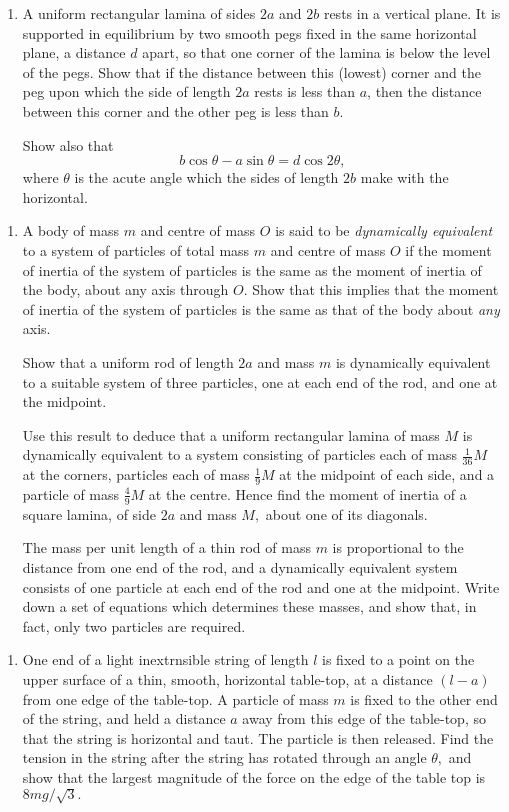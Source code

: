 \documentclass[a4, 11pt]{report}
\newlength{\qspace}
\newcounter{qnumber}
\newenvironment{question}%
 {\vspace{\qspace}
  \begin{enumerate}[\bfseries 1\quad][10]%
    \setcounter{enumi}{\value{qnumber}}%
    \item%
 }
{
  \end{enumerate}
  \filbreak
  \stepcounter{qnumber}
 }
\begin{document}
\begin{question}	
A uniform rectangular lamina of sides $2a$ and $2b$ rests in a vertical
plane. It is supported in equilibrium by two smooth pegs fixed in
the same horizontal plane, a distance $d$ apart, so that one corner
of the lamina is below the level of the pegs. Show that if the distance
between this (lowest) corner and the peg upon which the side of length
$2a$ rests is less than $a$, then the distance between this corner
and the other peg is less than $b$. 


Show also that 
\[
b\cos\theta-a\sin\theta=d\cos2\theta,
\]
where $\theta$ is the acute angle which the sides of length $2b$
make with the horizontal.
\end{question}


\begin{question}
A body of mass $m$ and centre of mass $O$ is said to be \textit{dynamically
equivalent }to a system of particles of total mass $m$ and centre
of mass $O$ if the moment of inertia of the system of particles is
the same as the moment of inertia of the body, about any axis through
$O$. Show that this implies that the moment of inertia of the system
of particles is the same as that of the body about \textit{any }axis. 


Show that a uniform rod of length $2a$ and mass $m$ is dynamically
equivalent to a suitable system of three particles, one at each end
of the rod, and one at the midpoint. 


Use this result to deduce that a uniform rectangular lamina of mass
$M$ is dynamically equivalent to a system consisting of particles
each of mass $\frac{1}{36}M$ at the corners, particles each of mass
$\frac{1}{9}M$ at the midpoint of each side, and a particle of mass
$\frac{4}{9}M$ at the centre. Hence find the moment of inertia of
a square lamina, of side $2a$ and mass $M,$ about one of its diagonals. 


The mass per unit length of a thin rod of mass $m$ is proportional
to the distance from one end of the rod, and a dynamically equivalent
system consists of one particle at each end of the rod and one at
the midpoint. Write down a set of equations which determines these
masses, and show that, in fact, only two particles are required. 
\end{question}
	
\begin{question}
One end of a light inextrnsible string of length $l$ is fixed to
a point on the upper surface of a thin, smooth, horizontal table-top,
at a distance $(l-a)$ from one edge of the table-top. A particle
of mass $m$ is fixed to the other end of the string, and held a distance
$a$ away from this edge of the table-top, so that the string is horizontal
and taut. The particle is then released. Find the tension in the string
after the string has rotated through an angle $\theta,$ and show
that the largest magnitude of the force on the edge of the table top
is $8mg/\sqrt{3}.$  
\end{question}
	
\end{document}
